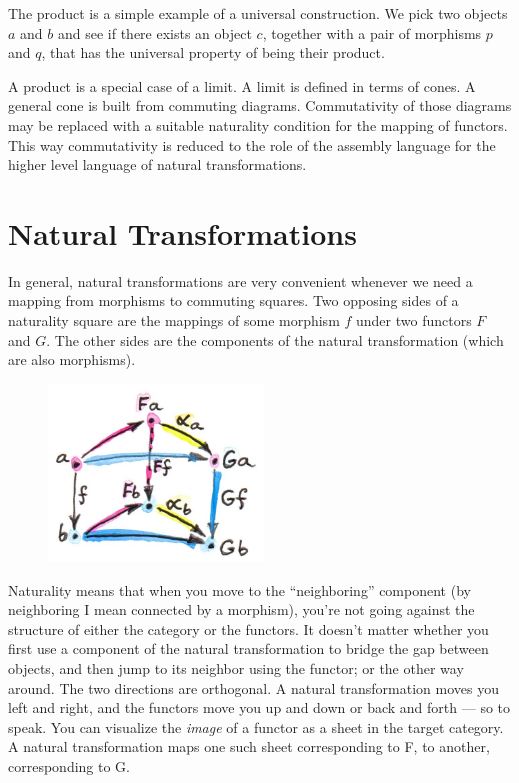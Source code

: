 The product is a simple example of a universal construction. We pick two
objects $a$ and $b$ and see if there exists an object
$c$, together with a pair of morphisms $p$ and $q$,
that has the universal property of being their product.

A product is a special case of a limit. A limit is defined in terms of
cones. A general cone is built from commuting diagrams. Commutativity of
those diagrams may be replaced with a suitable naturality condition for
the mapping of functors. This way commutativity is reduced to the role
of the assembly language for the higher level language of natural
transformations.

\section{Natural Transformations}

In general, natural transformations are very convenient whenever we need
a mapping from morphisms to commuting squares. Two opposing sides of a
naturality square are the mappings of some morphism $f$ under two
functors $F$ and $G$. The other sides are the components
of the natural transformation (which are also morphisms).

\begin{figure}[H]
\centering
\includegraphics[width=2.25000in]{images/3_naturality.jpg}
\end{figure}

\noindent
Naturality means that when you move to the ``neighboring'' component (by
neighboring I mean connected by a morphism), you're not going against
the structure of either the category or the functors. It doesn't matter
whether you first use a component of the natural transformation to
bridge the gap between objects, and then jump to its neighbor using the
functor; or the other way around. The two directions are orthogonal. A
natural transformation moves you left and right, and the functors move
you up and down or back and forth --- so to speak. You can visualize the
\emph{image} of a functor as a sheet in the target category. A natural
transformation maps one such sheet corresponding to F, to another,
corresponding to G.

